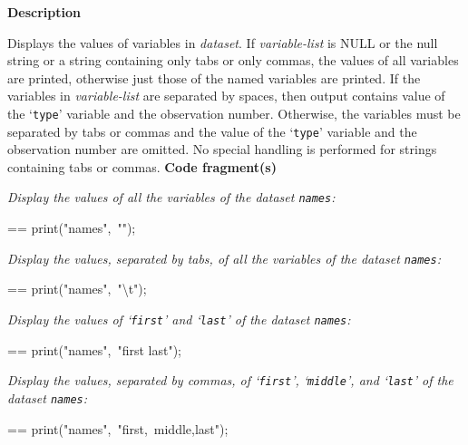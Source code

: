 \documentclass{book}
\makeatletter
\newcommand\Texinfocommandstyletextvar[1]{{\normalfont{}\textsl{#1}}}%
\newenvironment{Texinfopreformatted}{%
  \par\GNUTobeylines\obeyspaces\frenchspacing\parskip=\z@\parindent=\z@}{}
{\catcode`\^^M=13 \gdef\GNUTobeylines{\catcode`\^^M=13 \def^^M{\null\par}}}
\newenvironment{Texinfoindented}{\begin{list}{}{}\item\relax}{\end{list}}
\renewcommand{\_}{\Texinfounderscore\discretionary{}{}{}}
\makeatother
\begin{document}
%
%

\noindent{}\textbf{Description}

Displays the values of variables in \Texinfocommandstyletextvar{dataset}.
If \Texinfocommandstyletextvar{variable-list} is NULL or the null string or a string containing
only tabs or only commas, the values
of all variables are printed, otherwise just those of the named variables
are printed.
If the variables in \Texinfocommandstyletextvar{variable-list} are separated by spaces, then output
contains value of the `\texttt{\_type\_}' variable and the observation number.
Otherwise, the variables must be separated by tabs or commas and
the value of the `\texttt{\_type\_}' variable and the observation number are omitted.
No special handling is performed for strings containing tabs or commas.
\noindent{}\textbf{Code fragment(s)}

\emph{Display the values of all the variables of the dataset \texttt{names}:}
\begin{Texinfoindented}
\begin{Texinfopreformatted}%
\ttfamily print("names",\ "");
\end{Texinfopreformatted}
\end{Texinfoindented}

\emph{Display the values, separated by tabs, of all the variables of the dataset \texttt{names}:}
\begin{Texinfoindented}
\begin{Texinfopreformatted}%
\ttfamily print("names",\ "\textbackslash{}t");
\end{Texinfopreformatted}
\end{Texinfoindented}

\emph{Display the values of `\texttt{first}' and `\texttt{last}'
of the dataset \texttt{names}:}
\begin{Texinfoindented}
\begin{Texinfopreformatted}%
\ttfamily print("names",\ "first last");
\end{Texinfopreformatted}
\end{Texinfoindented}

\emph{Display the values, separated by commas, of `\texttt{first}', `\texttt{middle}', and `\texttt{last}'
of the dataset \texttt{names}:}
\begin{Texinfoindented}
\begin{Texinfopreformatted}%
\ttfamily print("names",\ "first,\ middle,last");
\end{Texinfopreformatted}
\end{Texinfoindented}
\end{document}
